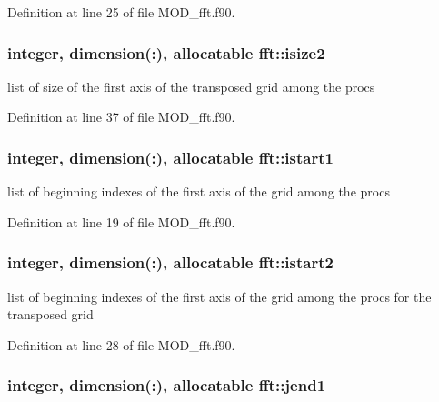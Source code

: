 Definition at line 25 of file M\-O\-D\-\_\-fft.\-f90.

\hypertarget{classfft_ac1c3bf32077bd22969d9e5092ec0a87c}{
\subsubsection[{isize2}]{\setlength{\rightskip}{0pt plus 5cm}integer, dimension(\-:), allocatable fft\-::isize2}}\label{classfft_ac1c3bf32077bd22969d9e5092ec0a87c}


list of size of the first axis of the transposed grid among the procs 



Definition at line 37 of file M\-O\-D\-\_\-fft.\-f90.

\hypertarget{classfft_a0f2de67487b3b9ef7ab687ea7aa6f789}{
\subsubsection[{istart1}]{\setlength{\rightskip}{0pt plus 5cm}integer, dimension(\-:), allocatable fft\-::istart1}}\label{classfft_a0f2de67487b3b9ef7ab687ea7aa6f789}


list of beginning indexes of the first axis of the grid among the procs 



Definition at line 19 of file M\-O\-D\-\_\-fft.\-f90.

\hypertarget{classfft_ab0ad37b8471978ecdeff1a3aca768f39}{
\subsubsection[{istart2}]{\setlength{\rightskip}{0pt plus 5cm}integer, dimension(\-:), allocatable fft\-::istart2}}\label{classfft_ab0ad37b8471978ecdeff1a3aca768f39}


list of beginning indexes of the first axis of the grid among the procs for the transposed grid 



Definition at line 28 of file M\-O\-D\-\_\-fft.\-f90.

\hypertarget{classfft_a36b50ebfb01d553c2d6f1376d57639a8}{
\subsubsection[{jend1}]{\setlength{\rightskip}{0pt plus 5cm}integer, dimension(\-:), allocatable fft\-::jend1}}\label{classfft_a36b50ebfb01d553c2d6f1376d57639a8}


